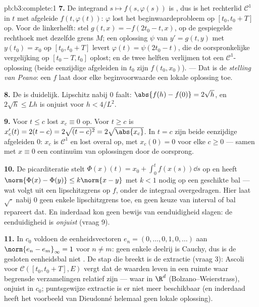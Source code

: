 \begin{solution}{pb:b3:complete:1}
\textbf{7.} De integrand $s \mapsto f(s, \varphi(s))$ is ,
dus is het rechterlid $\mathcal C^1$ in $t$ met afgeleide $f(t,
\varphi(t))$: $\varphi$ lost het beginwaardeprobleem op $[t_0, t_0
+ T]$ op. Voor de linkerhelft: stel $g(t, x) = -f(2t_0 - t, x)$,
 op de gespiegelde rechthoek met dezelfde grens $M$; een
oplossing $\psi$ van $y' = g(t,y)$ met $y(t_0) = x_0$ op $[t_0,
t_0 + T]$ levert $\varphi(t) = \psi(2t_0 - t)$, die de
oorspronkelijke vergelijking op $[t_0 - T, t_0]$ oplost; en de
twee helften verlijmen tot een $\mathcal C^1$-oplossing (beide
eenzijdige afgeleiden in $t_0$ zijn $f(t_0, x_0)$). --- Dat is de
\emph{stelling van Peano}: een  $f$ laat door elke
beginvoorwaarde een lokale oplossing toe.

\textbf{8.} De  is duidelijk. Lipschitz nabij $0$
faalt: $\abs{f(h) - f(0)} = 2\sqrt h$, en $2\sqrt h \leq L h$ is
onjuist voor $h < 4/L^2$.

\textbf{9.} Voor $t \leq c$ lost $x_c \equiv 0$ op. Voor $t \geq
c$ is $x_c'(t) = 2(t - c) = 2\sqrt{(t-c)^2} = 2\sqrt{\abs{x_c}}$.
In $t = c$ zijn beide eenzijdige afgeleiden $0$: $x_c$ is
$\mathcal C^1$ en lost overal op, met $x_c(0) = 0$ voor elke $c
\geq 0$ --- samen met $x \equiv 0$ een continuüm van oplossingen
door de oorsprong.

\textbf{10.} De picarditeratie stelt $\Phi(x)(t) = x_0 + \int_0^t
f(x(s))\dd s$ op en heeft $\norm{\Phi(x) - \Phi(y)} \leq
k\norm{x - y}$ met $k < 1$ nodig op een geschikte bal --- wat
volgt uit een lipschitzgrens op $f$, onder de integraal
overgedragen. Hier laat $\sqrt\cdot$ nabij $0$ geen enkele
lipschitzgrens toe, en geen keuze van interval of bal repareert
dat. En inderdaad kon geen bewijs van eenduidigheid slagen: de
eenduidigheid is \emph{onjuist} (vraag 9).

\textbf{11.} In $c_0$ voldoen de eenheidsvectoren $e_n = (0,
\dots, 0, 1, 0, \dots)$ aan $\norm{e_n - e_m}_\infty = 1$ voor $n
\neq m$: geen enkele deelrij is Cauchy, dus is de gesloten
eenheidsbal niet . De stap die breekt is de extractie
(vraag 3): Ascoli voor $\mathcal C([t_0, t_0+T], E)$ vergt dat de
waarden leven in een ruimte waar begrensde verzamelingen relatief
 zijn --- waar in $\R^d$ (Bolzano--Weierstrass), onjuist in
$c_0$; puntsgewijze extractie is er niet meer beschikbaar (en
inderdaad heeft het voorbeeld van Dieudonné helemaal geen lokale
oplossing).


\end{solution}
